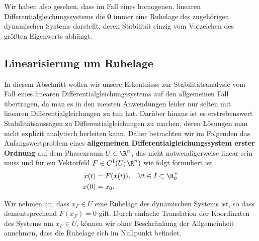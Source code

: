 \documentclass[letterpaper,10pt,german]{jupyterBook}
\begin{document}
\par
Wir haben also gesehen, dass im Fall eines homogenen, linearen Differentialgleichungssystems die \(\mathbf{0}\) immer eine Ruhelage des zugehörigen dynamischen Systems darstellt, deren Stabilität einzig vom Vorzeichen des größten Eigenwerts abhängt.


\subsection{Linearisierung um Ruhelage}
\label{\detokenize{odestability/ruhelagen:linearisierung-um-ruhelage}}\label{\detokenize{odestability/ruhelagen:s-linearisierung-ruhelage}}
\par
In diesem Abschnitt wollen wir unsere Erkentnisse zur Stabilitätsanalysie vom Fall eines linearen Differentialgleichungssystems auf den allgemeinen Fall übertragen, da man es in den meisten Anwendungen leider nur selten mit linearen Differentialgleichungen zu tun hat.
Darüber hinaus ist es erstrebenswert Stabilitätsaussagen zu Differentialgleichungen zu machen, deren Lösungen man nicht explizit analytisch herleiten kann.
Daher betrachten wir im Folgenden das Anfangswertproblem eines \textbf{allgemeinen Differentialgleichungssystem erster Ordnung} auf dem Phasenraum \(U\in \R^n\), das nicht notwendigerweise linear sein muss und für ein Vektorfeld \(F\in C^1(U;\R^n)\) wie folgt formuliert ist
\begin{align}\label{equation:odestability/ruhelagen:eq:awpallg}
\dot{x}(t) &= F(x(t)), \quad \forall t \in I \subset \R^+_0\\
x(0) &= x_0.
\end{align}
\par
Wir nehmen an, dass \(x_F \in U\) eine Ruhelage des dynamischen Systems ist, so dass dementsprechend \(F(x_F) = 0\) gilt.
Durch einfache Translation der Koordinaten des Systems um \(x_F \in U\), können wir ohne Beschränkung der Allgemeinheit annehmen, dass die Ruhelage sich im Nullpunkt befindet.
\end{document}
